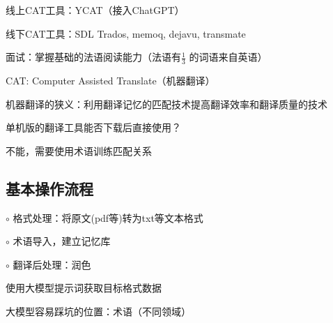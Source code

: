 \begin{notation}
    线上CAT工具：YCAT（接入ChatGPT）

    线下CAT工具：SDL Trados, memoq, dejavu, transmate
\end{notation}
\begin{notation}
    面试：掌握基础的法语阅读能力（法语有$\frac{1}{3}$ 的词语来自英语）
\end{notation}
\begin{notation}
    CAT: Computer Assisted Translate（机器翻译）

    机器翻译的狭义：利用翻译记忆的匹配技术提高翻译效率和翻译质量的技术
\end{notation}
\begin{question}
    单机版的翻译工具能否下载后直接使用？
\end{question}
不能，需要使用术语训练匹配关系
\subsection{基本操作流程}%
\label{sub:基本操作流程}
$\circ$ 格式处理：将原文(pdf等)转为txt等文本格式

$\circ$ 术语导入，建立记忆库

$\circ$ 翻译后处理：润色
\begin{notation}
使用大模型提示词获取目标格式数据
\end{notation}
大模型容易踩坑的位置：术语（不同领域）


